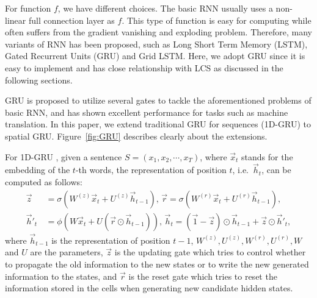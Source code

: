 For function $f$, we have different choices. The basic RNN usually uses a non-linear full connection layer as $f$. This type of function is easy for computing while often suffers from the gradient vanishing and exploding problem. Therefore, many variants of RNN has been proposed, such as Long Short Term Memory (LSTM), Gated Recurrent Units (GRU) and Grid LSTM. Here, we adopt GRU since it is easy to implement and has close relationship with LCS as discussed in the following sections.

GRU is proposed to utilize several gates to tackle the aforementioned problems of basic RNN, and has shown excellent performance for tasks such as machine translation. In this paper, we extend traditional GRU for sequences (1D-GRU) to spatial GRU. %
Figure~\ref{fig:GRU} describes clearly about the extensions.

For 1D-GRU , given a sentence $S{=}(x_1,x_2,\cdots,x_T)$, where $\vec{x}_t$ stands for the embedding of the $t$-th words, the representation of position $t$, i.e.~$\vec{h}_t$, can be computed as follows:
\begin{equation*}
	\begin{aligned}
		\vec{z} \,& {=} \sigma(W^{(z)}\vec{x}_t + U^{(z)}\vec{h}_{t-1}),\,\vec{r}{=} \sigma(W^{(r)}\vec{x}_t + U^{(r)}\vec{h}_{t-1}), \\
		\vec{h}'_t \,&{=} \phi(W\vec{x}_t{+}U(\vec{r}\odot \vec{h}_{t-1})),\,\vec{h}_t{=} (\vec{1}-\vec{z})\odot \vec{h}_{t-1} {+} \vec{z} \odot \vec{h}'_t,
	\end{aligned}
\end{equation*}
where $\vec{h}_{t-1}$ is the representation of position $t{-}1$, $W^{(z)},U^{(z)},W^{(r)},U^{(r)},W$ and $U$ are the parameters, $\vec{z}$ is the updating gate which tries to control whether to propagate the old information to the new states or to write the new generated information to the states, and $\vec{r}$ is the reset gate which tries to reset the information stored in the cells when generating new candidate hidden states.

